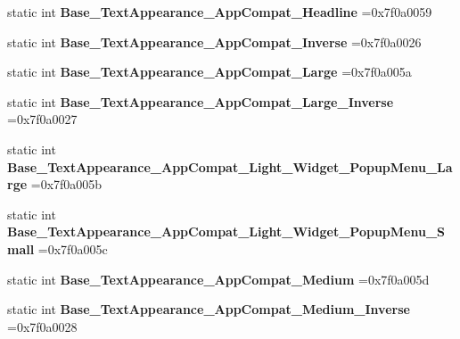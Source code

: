 \begin{DoxyCompactItemize}
static int {\bfseries Base\+\_\+\+Text\+Appearance\+\_\+\+App\+Compat\+\_\+\+Headline} =0x7f0a0059
\item 
\mbox{\label{classandroid_1_1support_1_1design_1_1R_1_1style_afa842f293556c442a366bc2f0b5831b9}} 
static int {\bfseries Base\+\_\+\+Text\+Appearance\+\_\+\+App\+Compat\+\_\+\+Inverse} =0x7f0a0026
\item 
\mbox{\label{classandroid_1_1support_1_1design_1_1R_1_1style_aa21fd8f317f5afb636e757377084db17}} 
static int {\bfseries Base\+\_\+\+Text\+Appearance\+\_\+\+App\+Compat\+\_\+\+Large} =0x7f0a005a
\item 
\mbox{\label{classandroid_1_1support_1_1design_1_1R_1_1style_a22df22b4184cbd0870a37c3dc8f4b2f5}} 
static int {\bfseries Base\+\_\+\+Text\+Appearance\+\_\+\+App\+Compat\+\_\+\+Large\+\_\+\+Inverse} =0x7f0a0027
\item 
\mbox{\label{classandroid_1_1support_1_1design_1_1R_1_1style_af37bd7c1a57aa36b9d8aa0c4e538beb8}} 
static int {\bfseries Base\+\_\+\+Text\+Appearance\+\_\+\+App\+Compat\+\_\+\+Light\+\_\+\+Widget\+\_\+\+Popup\+Menu\+\_\+\+Large} =0x7f0a005b
\item 
\mbox{\label{classandroid_1_1support_1_1design_1_1R_1_1style_aacf0989d03a502001e9c825dd156ff03}} 
static int {\bfseries Base\+\_\+\+Text\+Appearance\+\_\+\+App\+Compat\+\_\+\+Light\+\_\+\+Widget\+\_\+\+Popup\+Menu\+\_\+\+Small} =0x7f0a005c
\item 
\mbox{\label{classandroid_1_1support_1_1design_1_1R_1_1style_a21989a965f49471a88e6e415cc071bed}} 
static int {\bfseries Base\+\_\+\+Text\+Appearance\+\_\+\+App\+Compat\+\_\+\+Medium} =0x7f0a005d
\item 
\mbox{\label{classandroid_1_1support_1_1design_1_1R_1_1style_a6f936863965a759e78a16d068885f86a}} 
static int {\bfseries Base\+\_\+\+Text\+Appearance\+\_\+\+App\+Compat\+\_\+\+Medium\+\_\+\+Inverse} =0x7f0a0028
\item 

\end{DoxyCompactItemize}
